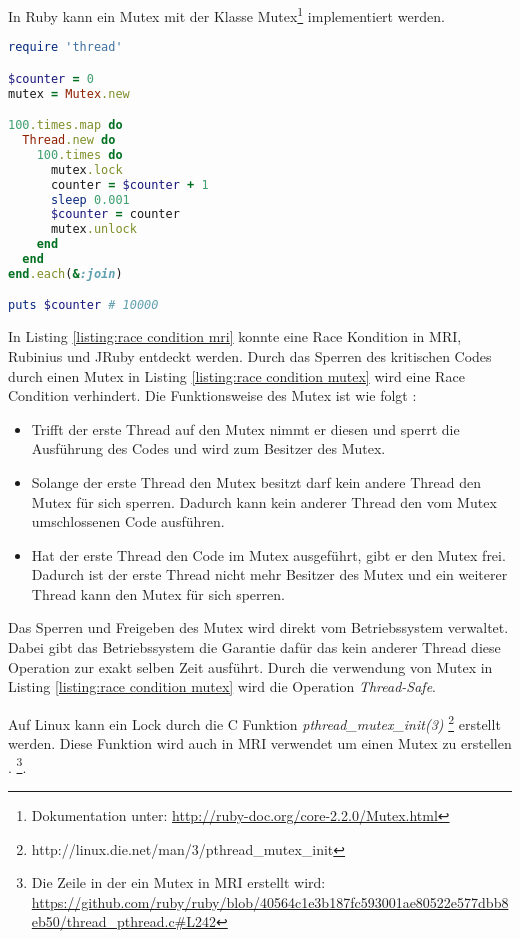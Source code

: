 In Ruby kann ein Mutex mit der Klasse Mutex\footnote{Dokumentation unter:  \url{http://ruby-doc.org/core-2.2.0/Mutex.html}} implementiert werden.


\begin{lstlisting}[language=Ruby,label={listing:race condition mutex}]
require 'thread'

$counter = 0
mutex = Mutex.new

100.times.map do
  Thread.new do
    100.times do
      mutex.lock
      counter = $counter + 1
      sleep 0.001
      $counter = counter
      mutex.unlock
    end
  end
end.each(&:join)

puts $counter # 10000
\end{lstlisting}

In Listing \ref{listing:race condition mri} konnte eine Race Kondition in MRI, Rubinius und JRuby entdeckt werden. Durch das Sperren des kritischen Codes durch einen Mutex in Listing \ref{listing:race condition mutex} wird eine Race Condition verhindert. Die Funktionsweise des Mutex ist wie folgt \cite[p. 83-84]{Sto2013}: 

\begin{itemize}
  \item Trifft der erste Thread auf den Mutex nimmt er diesen und sperrt die Ausführung des Codes und wird zum Besitzer des Mutex.
  \item Solange der erste Thread den Mutex besitzt darf kein andere Thread den Mutex für sich sperren. Dadurch kann kein anderer Thread den vom Mutex umschlossenen Code ausführen. 
  \item Hat der erste Thread den Code im Mutex ausgeführt, gibt er den Mutex frei. Dadurch ist der erste Thread nicht mehr Besitzer des Mutex und ein weiterer Thread kann den Mutex für sich sperren.
\end{itemize}

Das Sperren und Freigeben des Mutex wird direkt vom Betriebssystem verwaltet. Dabei gibt das Betriebssystem die Garantie dafür das kein anderer Thread diese Operation zur exakt selben Zeit ausführt. Durch die verwendung von Mutex in Listing \ref{listing:race condition mutex} wird die Operation \emph{Thread-Safe}.

Auf Linux kann ein Lock durch die C Funktion \emph{pthread_mutex_init(3)} \footnote{http://linux.die.net/man/3/pthread_mutex_init} erstellt werden. Diese Funktion wird auch in MRI verwendet um einen Mutex zu erstellen \cite[p. 83-84]{Sto2013}. \footnote{Die Zeile in der ein Mutex in MRI erstellt wird: \url{https://github.com/ruby/ruby/blob/40564c1e3b187fc593001ae80522e577dbb8eb50/thread_pthread.c#L242}}.

